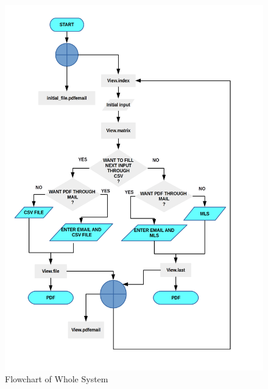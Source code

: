 \begin{figure}[H]
\centering \includegraphics[scale=0.26]{images/flowchart.png}
\caption{Flowchart of Whole System}
\label{fig:FD1}
\end{figure}

